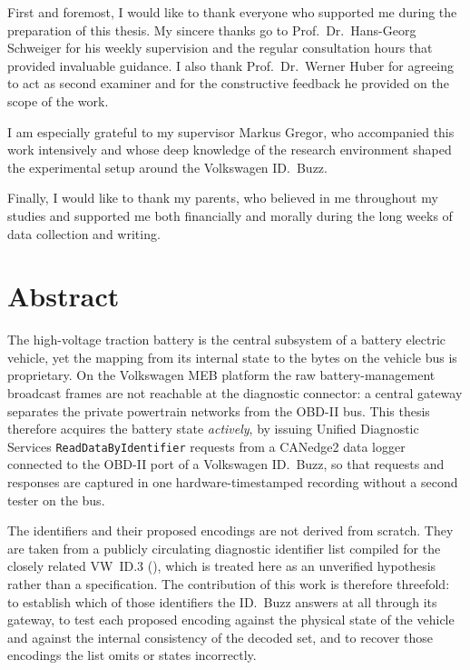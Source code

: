 \documentclass[11pt,a4paper,oneside,parskip=half]{scrreprt}
\begin{document}
First and foremost, I would like to thank everyone who supported me during the preparation of this thesis. My sincere thanks go to Prof.\ Dr.\ Hans-Georg Schweiger for his weekly supervision and the regular consultation hours that provided invaluable guidance. I also thank Prof.\ Dr.\ Werner Huber for agreeing to act as second examiner and for the constructive feedback he provided on the scope of the work.

I am especially grateful to my supervisor Markus Gregor, who accompanied this work intensively and whose deep knowledge of the research environment shaped the experimental setup around the Volkswagen ID.~Buzz.

Finally, I would like to thank my parents, who believed in me throughout my studies and supported me both financially and morally during the long weeks of data collection and writing.

\chapter*{Abstract}
\thispagestyle{plain}

The high-voltage traction battery is the central subsystem of a
battery electric vehicle, yet the mapping from its internal state to the bytes on the vehicle bus is
proprietary. On the Volkswagen MEB platform the raw battery-management broadcast frames are not
reachable at the diagnostic connector: a central gateway separates the private powertrain networks
from the OBD-II bus. This thesis therefore acquires the battery state \emph{actively}, by issuing
Unified Diagnostic Services \texttt{ReadDataByIdentifier} requests from a CANedge2 data logger
connected to the OBD-II port of a Volkswagen ID.~Buzz, so that requests and responses are captured in
one hardware-timestamped recording without a second tester on the bus.

The identifiers and their proposed encodings are not derived from scratch. They are taken from a
publicly circulating diagnostic identifier list compiled for the closely related VW~ID.3
(\cite{vwmebpidlist}), which is treated here as an unverified hypothesis rather than a specification.
The contribution of this work is therefore threefold: to establish which of those identifiers the
ID.~Buzz answers at all through its gateway, to test each proposed encoding against the physical
state of the vehicle and against the internal consistency of the decoded set, and to recover those
encodings the list omits or states incorrectly.
\end{document}
